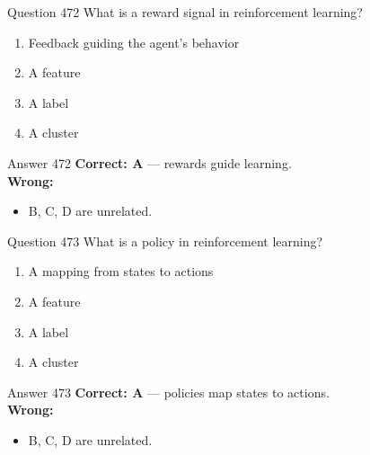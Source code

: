 \documentclass[aspectratio=169,11pt]{beamer}
\begin{document}
	\begin{frame}{Question 472}
		What is a reward signal in reinforcement learning?
		\begin{enumerate}[label=\Alph*.]
			\item Feedback guiding the agent's behavior
			\item A feature
			\item A label
			\item A cluster
		\end{enumerate}
	\end{frame}
	\begin{frame}{Answer 472}
		\textbf{Correct: A} --- rewards guide learning.\\
		\vspace{0.5em}
		\textbf{Wrong:}
		\begin{itemize}
			\item B, C, D are unrelated.
		\end{itemize}
	\end{frame}
	
	\begin{frame}{Question 473}
		What is a policy in reinforcement learning?
		\begin{enumerate}[label=\Alph*.]
			\item A mapping from states to actions
			\item A feature
			\item A label
			\item A cluster
		\end{enumerate}
	\end{frame}
	\begin{frame}{Answer 473}
		\textbf{Correct: A} --- policies map states to actions.\\
		\vspace{0.5em}
		\textbf{Wrong:}
		\begin{itemize}
			\item B, C, D are unrelated.
		\end{itemize}
	\end{frame}
	
\end{document}
